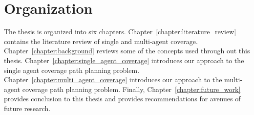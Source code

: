 \documentclass[../main.tex]{subfiles}
\begin{document}
\section{Organization}
\label{section:organization}

The thesis is organized into six chapters. Chapter~\ref{chapter:literature_review} contains the literature review of single and multi-agent coverage. Chapter~\ref{chapter:background} reviews some of the concepts used through out this thesis. Chapter~\ref{chapter:single_agent_coverage} introduces our approach to the single agent coverage path planning problem. Chapter~\ref{chapter:multi_agent_coverage} introduces our approach to the multi-agent coverage path planning problem. Finally, Chapter~\ref{chapter:future_work} provides conclusion to this thesis and provides recommendations for avenues of future research.
\end{document}

